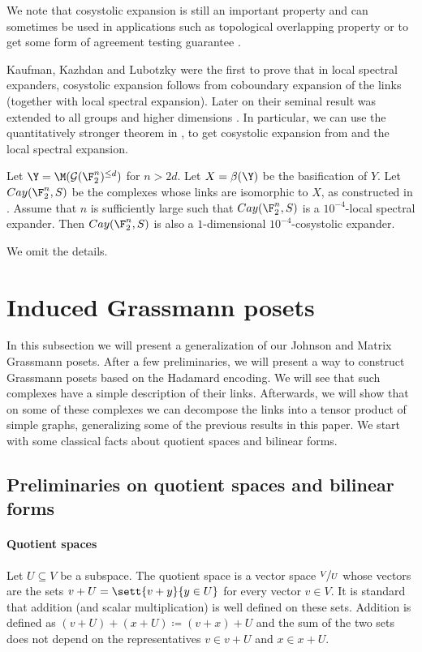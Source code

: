     We note that cosystolic expansion is still an important property and can sometimes be used in applications such as topological overlapping property \cite{DotterrerKW2018} or to get some form of agreement testing guarantee \cite{DiksteinD2023agr}.

Kaufman, Kazhdan and Lubotzky were the first to prove that in local spectral expanders, cosystolic expansion follows from coboundary expansion of the links \cite{KaufmanKL2016} (together with local spectral expansion). Later on their seminal result was extended to all groups and higher dimensions \cite{EvraK2016,KaufmanM2018,KaufmanM2021,KaufmanM2022,DiksteinD2023cbdry}. In particular, we can use the quantitatively stronger theorem in \cite[Theorem 1.2]{DiksteinD2023cbdry}, to get cosystolic expansion from  and the local spectral expansion.
\begin{corollary}
    Let \(\Y=\M(\mathcal{G}(\F_2^n)^{\leq d})\) for \(n > 2d\). Let \(X = \beta(\Y)\) be the basification of \(Y\). Let \(Cay(\F_2^n,S)\) be the complexes whose links are isomorphic to \(X\), as constructed in . Assume that \(n\) is sufficiently large such that \(Cay(\F_2^n,S)\) is a \(10^{-4}\)-local spectral expander. Then \(Cay(\F_2^n,S)\) is also a $1$-dimensional \(10^{-4}\)-cosystolic expander.
\end{corollary}
We omit the details.
 

\section{Induced Grassmann posets} \label{sec:induced-Grassmann}
In this subsection we will present a generalization of our Johnson and Matrix Grassmann posets. After a few preliminaries, we will present a way to construct Grassmann posets based on the Hadamard encoding. We will see that such complexes have a simple description of their links. Afterwards, we will show that on some of these complexes we can decompose the links into a tensor product of simple graphs, generalizing some of the previous results in this paper. We start with some classical facts about quotient spaces and bilinear forms. 
\subsection{Preliminaries on quotient spaces and bilinear forms}
\paragraph{Quotient spaces} Let \(U \subseteq V\) be a subspace. The quotient space is a vector space \(\nicefrac{V}{U}\) whose vectors are the sets \(v+U = \sett{v+y}{y \in U}\) for every vector \(v \in V\). It is standard that addition (and scalar multiplication) is well defined on these sets. Addition is defined as \((v+U) + (x+U) \coloneqq (v+x)+U\) and the sum of the two sets does not depend on the representatives \(v \in v+U\) and \(x \in x+U\).

